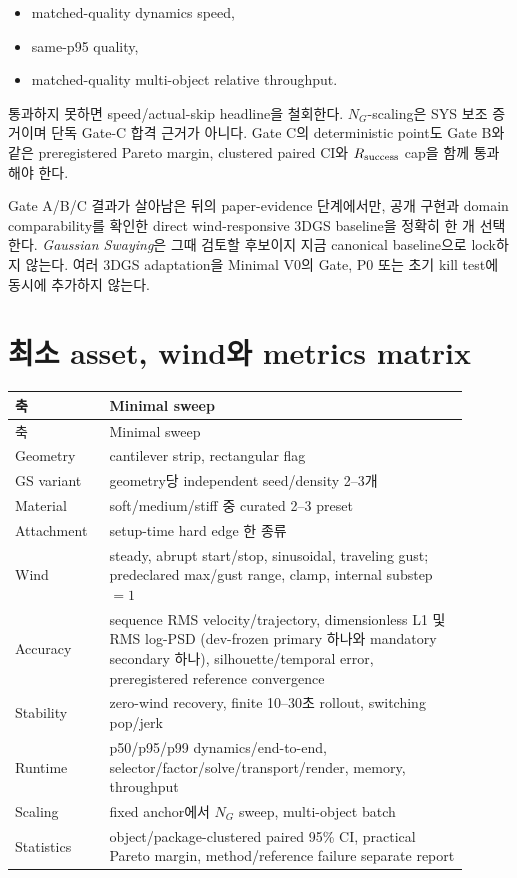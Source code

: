 \documentclass[10pt]{article}
\begin{document}
\begin{itemize}
  \item matched-quality dynamics speed,
  \item same-p95 quality,
  \item matched-quality multi-object relative throughput.
\end{itemize}

통과하지 못하면 speed/actual-skip headline을 철회한다.
\(N_G\)-scaling은 SYS 보조 증거이며 단독 Gate-C 합격 근거가 아니다.
Gate C의 deterministic point도 Gate B와 같은 preregistered Pareto margin, clustered paired CI와
\(R_{\rm success}\) cap을 함께 통과해야 한다.

Gate A/B/C 결과가 살아남은 뒤의 paper-evidence 단계에서만, 공개 구현과
domain comparability를 확인한 direct wind-responsive 3DGS baseline을 정확히 한 개 선택한다.
\emph{Gaussian Swaying}은 그때 검토할 후보이지 지금 canonical baseline으로 lock하지 않는다.
여러 3DGS adaptation을 Minimal V0의 Gate, P0 또는 초기 kill test에 동시에 추가하지 않는다.

\section{최소 asset, wind와 metrics matrix}

\begin{longtable}{L{0.18\linewidth}L{0.72\linewidth}}
\toprule
축 & Minimal sweep\\
\midrule
\endfirsthead
\toprule
축 & Minimal sweep\\
\midrule
\endhead
Geometry & cantilever strip, rectangular flag\\
GS variant & geometry당 independent seed/density 2--3개\\
Material & soft/medium/stiff 중 curated 2--3 preset\\
Attachment & setup-time hard edge 한 종류\\
Wind & steady, abrupt start/stop, sinusoidal, traveling gust; predeclared max/gust range,
clamp, internal substep \(=1\)\\
Accuracy & sequence RMS velocity/trajectory, dimensionless L1 및 RMS log-PSD
(dev-frozen primary 하나와 mandatory secondary 하나),
silhouette/temporal error, preregistered reference convergence\\
Stability & zero-wind recovery, finite 10--30초 rollout, switching pop/jerk\\
Runtime & p50/p95/p99 dynamics/end-to-end, selector/factor/solve/transport/render,
memory, throughput\\
Scaling & fixed anchor에서 \(N_G\) sweep, multi-object batch\\
Statistics & object/package-clustered paired 95\% CI, practical Pareto margin,
method/reference failure separate report\\
\bottomrule
\end{longtable}
\end{document}
